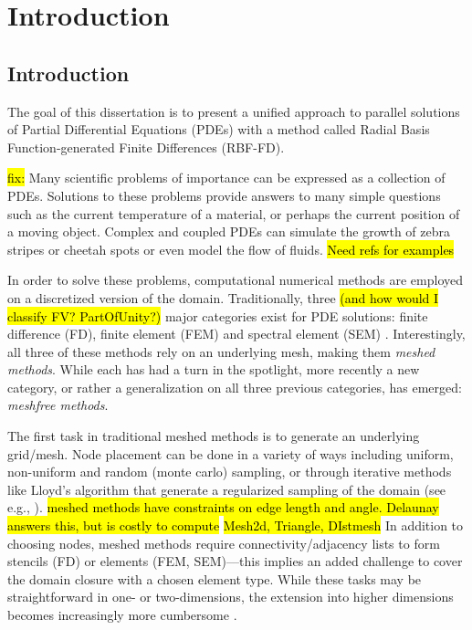 
\chapter{Introduction}

\section{Introduction}
\label{sec:intro}

The goal of this dissertation is to present a unified approach
to parallel solutions of Partial Differential Equations (PDEs)
with a method called Radial Basis Function-generated Finite
Differences (RBF-FD).

\hl{fix:}
Many scientific problems of importance can be expressed as a
collection of PDEs. Solutions to these problems provide answers to many simple
questions such as the current temperature of a material, or perhaps the
current position of a moving object. Complex and coupled PDEs can simulate the growth of zebra stripes or cheetah spots \cite{FuselierWright2012} or even model the flow of fluids. \hl{Need refs for examples}


In order to solve these problems, computational numerical
methods are employed on a discretized version of the domain.
Traditionally, three \hl{(and how would I classify FV? PartOfUnity?)} major categories exist for PDE solutions:
finite difference (FD), finite element (FEM) and spectral
element (SEM) \cite{Fasshauer2007}. Interestingly, all three of
these methods rely on an underlying mesh, making them
\emph{meshed methods}. While each has had a turn in the
spotlight, more recently a new category, or rather a
generalization on all three previous categories, has emerged:
\emph{meshfree methods}.

The first task in traditional meshed methods is to generate an
underlying grid/mesh. Node placement can be done in a variety of
ways including uniform, non-uniform and random (monte carlo)
sampling, or through iterative methods like Lloyd's algorithm
that generate a regularized sampling of the domain (see e.g.,
\cite{Du1999}). \hl{meshed methods have constraints on edge length and angle. Delaunay answers this, but is costly to compute}
\hl{Mesh2d, Triangle, DIstmesh} In addition to choosing nodes, meshed methods
require connectivity/adjacency lists to form stencils (FD) or
elements (FEM, SEM)---this implies an added challenge to cover
the domain closure with a chosen element type. While these tasks
may be straightforward in one- or two-dimensions, the extension
into higher dimensions becomes increasingly more cumbersome
\cite{Li2007}. 

